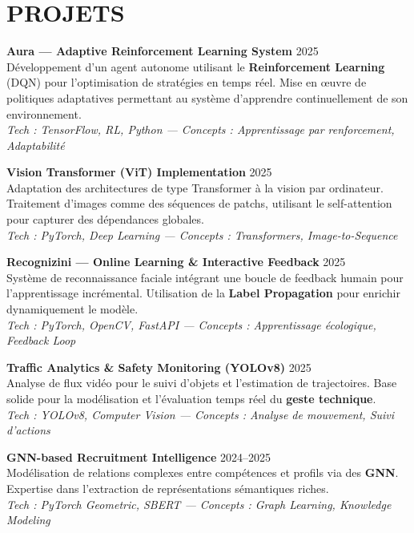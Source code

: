 \documentclass[a4paper,12pt]{article}
\begin{document}
\section{PROJETS}
\setlength{\parskip}{6pt}
{\small

\textbf{Aura — Adaptive Reinforcement Learning System} \hfill 2025 \\
Développement d’un agent autonome utilisant le \textbf{Reinforcement Learning} (DQN) pour l’optimisation de stratégies en temps réel. Mise en œuvre de politiques adaptatives permettant au système d’apprendre continuellement de son environnement. \\
\textit{Tech : TensorFlow, RL, Python — Concepts : Apprentissage par renforcement, Adaptabilité}

\textbf{Vision Transformer (ViT) Implementation} \hfill 2025 \\
Adaptation des architectures de type Transformer à la vision par ordinateur. Traitement d'images comme des séquences de patchs, utilisant le self-attention pour capturer des dépendances globales. \\
\textit{Tech : PyTorch, Deep Learning — Concepts : Transformers, Image-to-Sequence}

\textbf{Recognizini — Online Learning \& Interactive Feedback} \hfill 2025 \\
Système de reconnaissance faciale intégrant une boucle de feedback humain pour l’apprentissage incrémental. Utilisation de la \textbf{Label Propagation} pour enrichir dynamiquement le modèle. \\
\textit{Tech : PyTorch, OpenCV, FastAPI — Concepts : Apprentissage écologique, Feedback Loop}

\textbf{Traffic Analytics \& Safety Monitoring (YOLOv8)} \hfill 2025 \\
Analyse de flux vidéo pour le suivi d’objets et l'estimation de trajectoires. Base solide pour la modélisation et l’évaluation temps réel du \textbf{geste technique}. \\
\textit{Tech : YOLOv8, Computer Vision — Concepts : Analyse de mouvement, Suivi d'actions}

\textbf{GNN-based Recruitment Intelligence} \hfill 2024--2025 \\
Modélisation de relations complexes entre compétences et profils via des \textbf{GNN}. Expertise dans l’extraction de représentations sémantiques riches. \\
\textit{Tech : PyTorch Geometric, SBERT — Concepts : Graph Learning, Knowledge Modeling}

}
\end{document}
